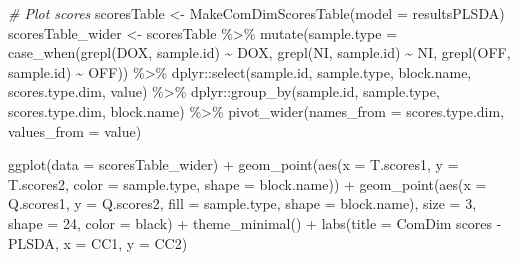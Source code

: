 \documentclass[
]{book}
\newenvironment{Shaded}{\begin{snugshade}}{\end{snugshade}}
\newcommand{\AttributeTok}[1]{\textcolor[rgb]{0.77,0.63,0.00}{#1}}
\newcommand{\CommentTok}[1]{\textcolor[rgb]{0.56,0.35,0.01}{\textit{#1}}}
\newcommand{\DecValTok}[1]{\textcolor[rgb]{0.00,0.00,0.81}{#1}}
\newcommand{\FunctionTok}[1]{\textcolor[rgb]{0.00,0.00,0.00}{#1}}
\newcommand{\NormalTok}[1]{#1}
\newcommand{\OtherTok}[1]{\textcolor[rgb]{0.56,0.35,0.01}{#1}}
\newcommand{\SpecialCharTok}[1]{\textcolor[rgb]{0.00,0.00,0.00}{#1}}
\newcommand{\StringTok}[1]{\textcolor[rgb]{0.31,0.60,0.02}{#1}}
\begin{document}
\begin{Shaded}
\begin{Highlighting}[]
\CommentTok{\# Plot scores}
\NormalTok{scoresTable }\OtherTok{\textless{}{-}} \FunctionTok{MakeComDimScoresTable}\NormalTok{(}\AttributeTok{model =}\NormalTok{ resultsPLSDA)}
\NormalTok{scoresTable\_wider }\OtherTok{\textless{}{-}}\NormalTok{ scoresTable }\SpecialCharTok{\%\textgreater{}\%}
  \FunctionTok{mutate}\NormalTok{(}\AttributeTok{sample.type =} \FunctionTok{case\_when}\NormalTok{(}\FunctionTok{grepl}\NormalTok{(}\StringTok{\textquotesingle{}DOX\textquotesingle{}}\NormalTok{, sample.id) }\SpecialCharTok{\textasciitilde{}} \StringTok{\textquotesingle{}DOX\textquotesingle{}}\NormalTok{,}
                                 \FunctionTok{grepl}\NormalTok{(}\StringTok{\textquotesingle{}NI\textquotesingle{}}\NormalTok{, sample.id) }\SpecialCharTok{\textasciitilde{}} \StringTok{\textquotesingle{}NI\textquotesingle{}}\NormalTok{,}
                                 \FunctionTok{grepl}\NormalTok{(}\StringTok{\textquotesingle{}OFF\textquotesingle{}}\NormalTok{, sample.id) }\SpecialCharTok{\textasciitilde{}} \StringTok{\textquotesingle{}OFF\textquotesingle{}}\NormalTok{)) }\SpecialCharTok{\%\textgreater{}\%}
\NormalTok{  dplyr}\SpecialCharTok{::}\FunctionTok{select}\NormalTok{(sample.id, sample.type, block.name, scores.type.dim, value) }\SpecialCharTok{\%\textgreater{}\%}
\NormalTok{  dplyr}\SpecialCharTok{::}\FunctionTok{group\_by}\NormalTok{(sample.id, sample.type, scores.type.dim, block.name) }\SpecialCharTok{\%\textgreater{}\%}
  \FunctionTok{pivot\_wider}\NormalTok{(}\AttributeTok{names\_from =}\NormalTok{ scores.type.dim, }\AttributeTok{values\_from =}\NormalTok{ value)}

\FunctionTok{ggplot}\NormalTok{(}\AttributeTok{data =}\NormalTok{ scoresTable\_wider) }\SpecialCharTok{+}
  \FunctionTok{geom\_point}\NormalTok{(}\FunctionTok{aes}\NormalTok{(}\AttributeTok{x =}\NormalTok{ T.scores1, }\AttributeTok{y =}\NormalTok{ T.scores2,}
                 \AttributeTok{color =}\NormalTok{ sample.type, }\AttributeTok{shape =}\NormalTok{ block.name)) }\SpecialCharTok{+}
  \FunctionTok{geom\_point}\NormalTok{(}\FunctionTok{aes}\NormalTok{(}\AttributeTok{x =}\NormalTok{ Q.scores1, }\AttributeTok{y =}\NormalTok{ Q.scores2,}
                 \AttributeTok{fill =}\NormalTok{ sample.type, }\AttributeTok{shape =}\NormalTok{ block.name),}
             \AttributeTok{size =} \DecValTok{3}\NormalTok{, }\AttributeTok{shape =} \DecValTok{24}\NormalTok{, }\AttributeTok{color =} \StringTok{\textquotesingle{}black\textquotesingle{}}\NormalTok{) }\SpecialCharTok{+}
  \FunctionTok{theme\_minimal}\NormalTok{() }\SpecialCharTok{+}
  \FunctionTok{labs}\NormalTok{(}\AttributeTok{title =} \StringTok{\textquotesingle{}ComDim scores {-} PLSDA\textquotesingle{}}\NormalTok{, }\AttributeTok{x =} \StringTok{\textquotesingle{}CC1\textquotesingle{}}\NormalTok{, }\AttributeTok{y =} \StringTok{\textquotesingle{}CC2\textquotesingle{}}\NormalTok{)}
\end{Highlighting}
\end{Shaded}
\end{document}
